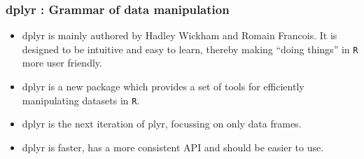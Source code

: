 \documentclass{beamer}
\begin{document}
	
	
\begin{frame}[fragile]
\frametitle{dplyr : Grammar of data manipulation}
\begin{itemize}
	\item dplyr  is mainly authored by Hadley Wickham and Romain Francois. It is designed to be intuitive and easy to learn, thereby making “doing things” in \texttt{R} more user friendly.
	\item dplyr is a new package which provides a set of tools for efficiently manipulating datasets in \texttt{R}.
	\item dplyr is the next iteration of plyr, focussing on only data frames. \item dplyr is faster, has a more consistent API and should be easier to use. 
\end{itemize}
\end{frame}
\end{document}
